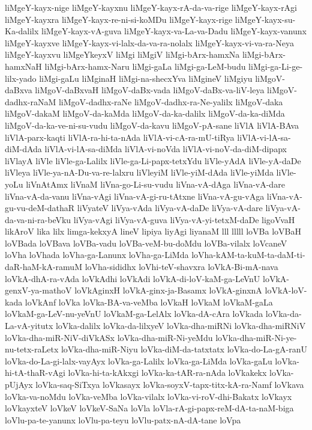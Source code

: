 {liMgeY-kayx-nige
liMgeY-kayxnu
liMgeY-kayx-rA-da-va-rige
liMgeY-kayx-rAgi
liMgeY-kayxra
liMgeY-kayx-re-ni-si-koMDu
liMgeY-kayx-rige
liMgeY-kayx-su-Ka-dalilx
liMgeY-kayx-vA-guva
liMgeY-kayx-va-La-va-Dadu
liMgeY-kayx-vanunx
liMgeY-kayxve
liMgeY-kayx-vi-lalx-da-va-ra-nolalx
liMgeY-kayx-vi-va-ra-Neya
liMgeY-kayxvu
liMgeYkeyxV
liMgi
liMgiV
liMgi-bArx-hamxNa
liMgi-bArx-hamxNaH
liMgi-bArx-hamx-Naru
liMgi-gaLa
liMgi-ga-LeM-budu
liMgi-ga-Li-ge-lilx-yado
liMgi-gaLu
liMginaH
liMgi-na-shecxYva
liMgineV
liMgiyu
liMgoV-daBxva
liMgoV-daBxvaH
liMgoV-daBx-vada
liMgoV-daBx-va-liV-leya
liMgoV-dadhx-raNaM
liMgoV-dadhx-raNe
liMgoV-dadhx-ra-Ne-yalilx
liMgoV-daka
liMgoV-dakaM
liMgoV-da-kaMda
liMgoV-da-ka-dalilx
liMgoV-da-ka-diMda
liMgoV-da-ka-ve-ni-su-vudu
liMgoV-da-kavu
liMgoV-pA-sane
liVlA
liVlA-BAva
liVlA-parx-kaqti
liVlA-ra-hi-ta-nAda
liVlA-vi-cA-ra-mU-tiRya
liVlA-vi-lA-sa-diM-dAda
liVlA-vi-lA-sa-diMda
liVlA-vi-noVda
liVlA-vi-noV-da-diM-dipapx
liVlayA
liVle
liVle-ga-Lalilx
liVle-ga-Li-papx-tetxYdu
liVle-yAdA
liVle-yA-daDe
liVleya
liVle-ya-nA-Du-va-re-lalxru
liVleyiM
liVle-yiM-dAda
liVle-yiMda
liVle-yoLu
liVnAtAmx
liVnaM
liVna-go-Li-su-vudu
liVna-vA-dAga
liVna-vA-dare
liVna-vA-da-vanu
liVna-vAgi
liVna-vA-gi-ru-tAtxne
liVna-vA-gu-vAga
liVna-vA-gu-vu-deM-dathaR
liVyateV
liVya-vAda
liVya-vA-daDe
liVya-vA-dare
liVya-vA-da-va-ni-ra-beVku
liVya-vAgi
liVya-vA-guva
liVya-vA-yi-tetxM-daDe
ligoVvaH
likAroV
lika
lilx
limga-kekxyA
lineV
lipiya
liyAgi
liyanaM
lll
lllll
loVBa
loVBaH
loVBada
loVBava
loVBa-vadu
loVBa-veM-bu-doMdu
loVBa-vilalx
loVcaneV
loVha
loVhada
loVha-ga-Lanunx
loVha-ga-LiMda
loVha-kAM-ta-kuM-ta-daM-ti-daR-haM-kA-ramuM
loVha-sididhx
loVhi-teV-shavxra
loVkA-Bi-mA-nava
loVkA-dhA-ra-vAda
loVkAdhi
loVkAdi
loVkA-di-loV-kaM-ga-LeVnU
loVkA-genxV-ya-mathoV
loVkAginxH
loVkA-ginx-ja-Basamx
loVkA-ginxnA
loVkA-loV-kada
loVkAnf
loVka
loVka-BA-va-veMba
loVkaH
loVkaM
loVkaM-gaLa
loVkaM-ga-LeV-nu-yeVnU
loVkaM-ga-LelAlx
loVka-dA-cAra
loVkada
loVka-da-La-vA-yitutx
loVka-dalilx
loVka-da-lilxyeV
loVka-dha-miRNi
loVka-dha-miRNiV
loVka-dha-miR-NiV-diVkASx
loVka-dha-miR-Ni-yeMdu
loVka-dha-miR-Ni-ye-nu-tetx-raLetx
loVka-dha-miR-Niyu
loVka-diM-da-tatxtatx
loVka-do-La-gA-ranU
loVka-do-La-gi-lalx-vayAyx
loVka-ga-Lalilx
loVka-ga-LiMda
loVka-gaLu
loVka-hi-tA-thaR-vAgi
loVka-hi-ta-kAkxgi
loVka-ka-tAR-ra-nAda
loVkakekx
loVka-pUjAyx
loVka-saq-SiTxya
loVkasayx
loVka-soyxV-tapx-titx-kA-ra-Namf
loVkava
loVka-va-noMdu
loVka-veMba
loVka-vilalx
loVka-vi-roV-dhi-Bakatx
loVkayx
loVkayxteV
loVkeV
loVkeV-SaNa
loVla
loVla-rA-gi-papx-reM-dA-ta-naM-biga
loVlu-pa-te-yanunx
loVlu-pa-teyu
loVlu-patx-nA-dA-tane
loVpa
}
